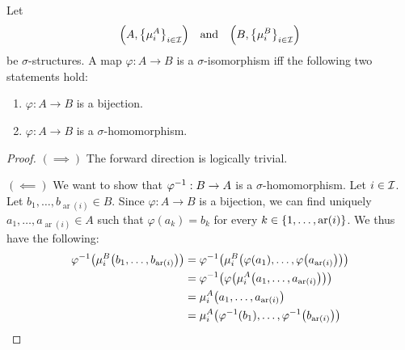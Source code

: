 \documentclass[11pt,reqno]{amsart}
\DeclareMathOperator{\ar}{ar}
\renewcommand{\phi}{\varphi}
\begin{document}
\begin{Thm}
\label{concise}
Let
\[
\Br{A,\set{\mu_i^A}_{i\in\I}}
\quad\text{and}\quad
\Br{B,\set{\mu_i^B}_{i\in\I}}
\]
be $\sigma$-structures.
A map $\phi:A\to B$ is a $\sigma$-isomorphism iff
the following two statements hold:
\begin{enumerate}
\item $\phi:A\to B$ is a bijection.
\item $\phi:A\to B$ is a $\sigma$-homomorphism.
\end{enumerate}
\end{Thm}
\begin{proof}
$(\implies)$
The forward direction is logically trivial.

$(\impliedby)$
We want to show that $\phi\inv:B\to A$ is a $\sigma$-homomorphism.
Let $i\in\mathcal{I}$.
Let $b_1,\dots,b_{\ar(i)}\in B$.
Since $\phi:A\to B$ is a bijection,
we can find uniquely $a_1,\dots,a_{\ar(i)}\in A$ such that
$\phi(a_k)=b_k$ for every $k\in\set{1,\dots,\ar(i)}$.
We thus have the following:
\[\begin{aligned}
\phi\inv\Br{\mu_i^B\Br{b_1,\dots,b_{\ar(i)}}}
&=\phi\inv\Br{\mu_i^B\Br{\phi(a_1),\dots,\phi\Br{a_{\ar(i)}}}}\\
&=\phi\inv\Br{\phi\Br{\mu_i^A\Br{a_1,\dots,a_{\ar(i)}}}}\\
&=\mu_i^A\Br{a_1,\dots,a_{\ar(i)}}\\
&=\mu_i^A\Br{\phi\inv(b_1),\dots,\phi\inv\Br{b_{\ar(i)}}}\\
\end{aligned}\]
\end{proof}
\end{document}
